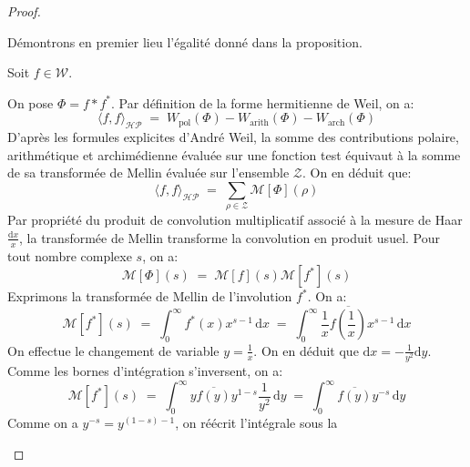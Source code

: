 \documentclass[Riemann_Hypothesis.tex]{subfiles}
\begin{document}
\begin{proof}
    \begin{part_proof}
        Démontrons en premier lieu l'égalité donné dans la proposition. \par
        Soit $f \in \mathcal{W}$. \par
        On pose $\Phi = f * f^*$. Par définition de la forme hermitienne de Weil,
        on a:
        \begin{equation*}
            \langle f, f \rangle_{\mathcal{HP}} \;=\; W_{\text{pol}}(\Phi) - W_{\text{arith}}(\Phi) - W_{\text{arch}}(\Phi)
        \end{equation*}
        D'après les formules explicites d'André Weil, la somme des contributions
        polaire, arithmétique et archimédienne évaluée sur une fonction test
        équivaut à la somme de sa transformée de Mellin évaluée sur l'ensemble
        $\mathcal{Z}$.
        On en déduit que:
        \begin{equation*}
            \langle f, f \rangle_{\mathcal{HP}} \;=\; \sum_{\rho \in \mathcal{Z}}
            \mathcal{M}[\Phi](\rho)
        \end{equation*}
        Par propriété du produit de convolution multiplicatif associé à la mesure
        de Haar $\frac{\mathrm{d}x}{x}$, la transformée de Mellin transforme la
        convolution en produit usuel. Pour tout nombre complexe $s$, on a:
        \begin{equation*}
            \mathcal{M}[\Phi](s) \;=\; \mathcal{M}[f](s) \mathcal{M}[f^*](s)
        \end{equation*}
        Exprimons la transformée de Mellin de l'involution $f^*$. On a:
        \begin{equation*}
            \mathcal{M}[f^*](s) \;=\; \int_{0}^{\infty} f^*(x) x^{s-1} \,
            \mathrm{d}x \;=\; \int_{0}^{\infty} \frac{1}{x}
            \overline{f\left(\frac{1}{x}\right)} x^{s-1} \, \mathrm{d}x
        \end{equation*}
        On effectue le changement de variable $y = \frac{1}{x}$. On en déduit
        que $\mathrm{d}x = - \frac{1}{y^2} \mathrm{d}y$. Comme les bornes
        d'intégration s'inversent, on a:
        \begin{equation*}
            \mathcal{M}[f^*](s) \;=\; \int_{0}^{\infty} y \overline{f(y)} y^{1-s}
            \frac{1}{y^2} \, \mathrm{d}y \;=\; \int_{0}^{\infty} \overline{f(y)}
            y^{-s} \, \mathrm{d}y
        \end{equation*}
        Comme on a $y^{-s} = y^{(1 - s) - 1}$, on réécrit l'intégrale sous la

\end{part_proof}
\end{proof}
\end{document}
